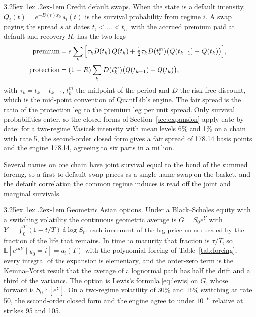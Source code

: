 \documentclass[11pt]{article}
\makeatletter
\renewcommand\paragraph{\@startsection{paragraph}{4}{\z@}%
  {3.25ex \@plus1ex \@minus.2ex}{-1em}%
  {\normalfont\normalsize\itshape}}
\theoremstyle{remark}
\newcommand{\E}{\mathbb{E}}
\newcommand{\dd}{\,\mathrm{d}}
\newcommand{\ql}{\textsf{QuantLib}}
\makeatother
\begin{document}
\paragraph{Credit default swaps.}
When the state is a default intensity, $Q_i(t) = e^{-B(t)x_0}\,a_i(t)$ is the survival probability from regime
$i$. A swap paying the spread $s$ at dates $t_1 < \dots < t_n$, with the accrued premium paid at default and
recovery $R$, has the two legs
\begin{align}
  \text{premium} &= s\sum_k\Big[\tau_k D(t_k)\,Q(t_k) + \tfrac12\tau_k D(t_k^m)\big(Q(t_{k-1}) - Q(t_k)\big)\Big], \notag\\
  \text{protection} &= (1 - R)\sum_k D(t_k^m)\big(Q(t_{k-1}) - Q(t_k)\big),
  \label{eq:cds}
\end{align}
with $\tau_k = t_k - t_{k-1}$, $t_k^m$ the midpoint of the period and $D$ the risk-free discount, which is the
mid-point convention of \ql{}'s engine. The fair spread is the ratio of the protection leg to the premium leg
per unit spread. Only survival probabilities enter, so the closed forms of Section~\ref{sec:expansion} apply date
by date: for a two-regime Vasicek intensity with mean levels 6\% and 1\% on a chain with rate 5, the second-order
closed form gives a fair spread of 178.14 basis points and the engine 178.14, agreeing to six parts in a million.

Several names on one chain have joint survival equal to the bond of the summed forcing, so a first-to-default
swap prices as a single-name swap on the basket, and the default correlation the common regime induces is read
off the joint and marginal survivals.

\paragraph{Geometric Asian options.}
Under a Black--Scholes equity with a switching volatility the continuous geometric average is $G = S_0 e^Y$ with
$Y = \int_0^T (1 - t/T)\dd\log S_t$: each increment of the log price enters scaled by the fraction of the life
that remains. In time to maturity that fraction is $\tau/T$, so $\E[e^{iuY}\mid y_0 = i] = a_i(T)$ with the
polynomial forcing of Table~\ref{tab:forcing}, every integral of the expansion is elementary, and the order-zero
term is the Kemna--Vorst result that the average of a lognormal path has half the drift and a third of the
variance. The option is Lewis's formula \eqref{eq:lewis} on $G$, whose forward is $S_0\,\E[e^Y]$. On a two-regime
volatility of 30\% and 15\% switching at rate 50, the second-order closed form and the engine agree to under
$10^{-6}$ relative at strikes 95 and 105.
\end{document}

